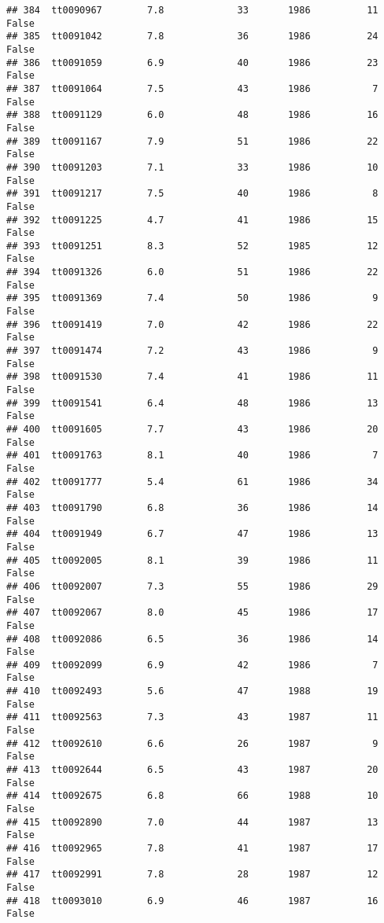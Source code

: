 \documentclass[
]{article}
\begin{document}
\begin{verbatim}
## 384  tt0090967        7.8             33       1986          11   False
## 385  tt0091042        7.8             36       1986          24   False
## 386  tt0091059        6.9             40       1986          23   False
## 387  tt0091064        7.5             43       1986           7   False
## 388  tt0091129        6.0             48       1986          16   False
## 389  tt0091167        7.9             51       1986          22   False
## 390  tt0091203        7.1             33       1986          10   False
## 391  tt0091217        7.5             40       1986           8   False
## 392  tt0091225        4.7             41       1986          15   False
## 393  tt0091251        8.3             52       1985          12   False
## 394  tt0091326        6.0             51       1986          22   False
## 395  tt0091369        7.4             50       1986           9   False
## 396  tt0091419        7.0             42       1986          22   False
## 397  tt0091474        7.2             43       1986           9   False
## 398  tt0091530        7.4             41       1986          11   False
## 399  tt0091541        6.4             48       1986          13   False
## 400  tt0091605        7.7             43       1986          20   False
## 401  tt0091763        8.1             40       1986           7   False
## 402  tt0091777        5.4             61       1986          34   False
## 403  tt0091790        6.8             36       1986          14   False
## 404  tt0091949        6.7             47       1986          13   False
## 405  tt0092005        8.1             39       1986          11   False
## 406  tt0092007        7.3             55       1986          29   False
## 407  tt0092067        8.0             45       1986          17   False
## 408  tt0092086        6.5             36       1986          14   False
## 409  tt0092099        6.9             42       1986           7   False
## 410  tt0092493        5.6             47       1988          19   False
## 411  tt0092563        7.3             43       1987          11   False
## 412  tt0092610        6.6             26       1987           9   False
## 413  tt0092644        6.5             43       1987          20   False
## 414  tt0092675        6.8             66       1988          10   False
## 415  tt0092890        7.0             44       1987          13   False
## 416  tt0092965        7.8             41       1987          17   False
## 417  tt0092991        7.8             28       1987          12   False
## 418  tt0093010        6.9             46       1987          16   False

\end{verbatim}
\end{document}
